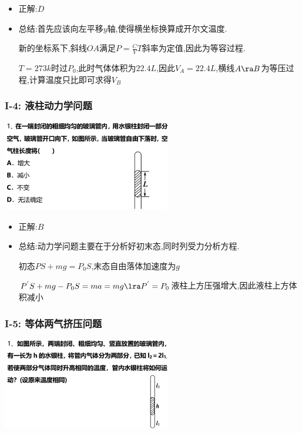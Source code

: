 \documentclass{article}
\begin{document}
\begin{itemize}
    \item 正解:\quad $D$
    \item 总结:\quad 首先应该向左平移$y$轴,使得横坐标换算成开尔文温度.

          \hspace{3.3em}新的坐标系下,斜线$OA$满足$P = \frac{C}{V}T$斜率为定值,因此为等容过程.

          \hspace{3.3em}$T = 273k$时过$P_{0}$,此时气体体积为$22.4L$,因此$V_{A} = 22.4L$,横线$A \ra B$为等压过程,计算温度只比即可求得$V_{B}$
\end{itemize}

\vspace{2em}

\subsubsection{I-4: 液柱动力学问题}
\includegraphics[width = 0.55\textwidth,keepaspectratio]{./pictures/2.3-4.png}

\begin{itemize}
    \item 正解:\quad $B$
    \item 总结:\quad 动力学问题主要在于分析好初末态,同时列受力分析方程.

          \hspace{3.3em}初态$PS + mg = P_{0}S$,末态自由落体加速度为$g$

          \hspace{3.3em}$P^{'}S + mg - P_{0}S = ma = mg \lra P^{'} = P_{0}$液柱上方压强增大,因此液柱上方体积减小
\end{itemize}

\vspace{2em}

\subsubsection{I-5: 等体两气挤压问题}
\includegraphics[width = 0.55\textwidth,keepaspectratio]{./pictures/2.3-5.png}
\end{document}
